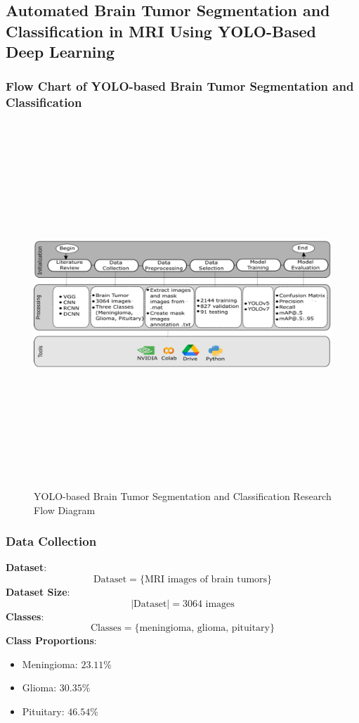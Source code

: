 \documentclass[a4paper,12pt]{extarticle}
\begin{document}
\newpage
\subsection{Automated Brain Tumor Segmentation
and Classification in MRI Using
YOLO-Based Deep Learning}
\subsubsection{Flow Chart of YOLO-based Brain Tumor Segmentation and Classification}
\begin{figure}[H] %
    \centering
    \includegraphics[width=\linewidth, height=13.7cm, keepaspectratio]{figure/yolo.png}
    \caption{YOLO-based Brain Tumor Segmentation and Classification Research Flow Diagram}
    \label{fig:YOLO-based Brain Tumor Segmentation and Classification Research Flow Block Diagram.}
\end{figure}
\subsubsection{Data Collection}
\textbf{Dataset}: 
\[ \text{Dataset} = \{\text{MRI images of brain tumors}\} \]
\textbf{Dataset Size}: 
\[ |\text{Dataset}| = 3064 \text{ images} \]
\textbf{Classes}: 
\[ \text{Classes} = \{\text{meningioma, glioma, pituitary}\} \]
\textbf{Class Proportions}:
\begin{itemize}
    \item Meningioma: \(23.11\% \)
    \item Glioma: \(30.35\% \)
    \item Pituitary: \(46.54\% \)
\end{itemize}
\end{document}
